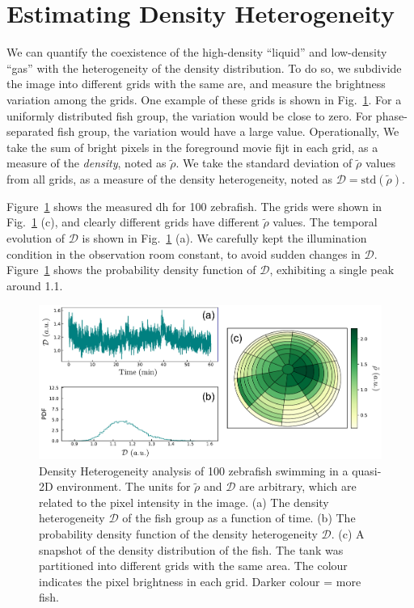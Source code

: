 \documentclass[11pt,twoside]{report}
\begin{document}
\section{Estimating Density Heterogeneity}



We can quantify the coexistence of the high-density ``liquid'' and low-density ``gas'' with the heterogeneity of the density distribution.
To do so, we subdivide the image into different grids with the same are, and measure the brightness variation among the grids.
One example of these grids is shown in Fig.~\ref{fig:density}.
For a uniformly distributed fish group, the variation would be close to zero. For phase-separated fish group, the variation would have a large value. 
Operationally, We take the sum of bright pixels in the foreground movie \gls{fijt} in each grid, as a measure of the \emph{density}, noted as $\tilde{\rho}$. We take the standard deviation of $\tilde{\rho}$ values from all grids, as a measure of the density heterogeneity, noted as $\mathcal{D} = \mathrm{std}(\tilde\rho)$.


Figure~\ref{fig:density} shows the measured \gls{dh} for 100 zebrafish. The grids were shown in Fig.~\ref{fig:density} (c), and clearly different grids have different $\tilde{\rho}$ values. The temporal evolution of $\mathcal{D}$ is shown in Fig.~\ref{fig:density} (a). We carefully kept the illumination condition in the observation room constant, to avoid sudden changes in $\mathcal{D}$. Figure~\ref{fig:density} shows the probability density function of $\mathcal{D}$, exhibiting a single peak around 1.1.


\begin{figure}
  \includegraphics[width=\linewidth]{density}
  \caption[Density Heterogeneity analysis of 100 zebrafish]{
  Density Heterogeneity analysis of 100 zebrafish swimming in a quasi-2D environment. The units for $\tilde{\rho}$ and $\mathcal{D}$ are arbitrary, which are related to the pixel intensity in the image.
  (a) The density heterogeneity $\mathcal{D}$ of the fish group as a function of time. 
  (b) The probability density function of the density heterogeneity $\mathcal{D}$.
  (c) A snapshot of the density distribution of the fish. The tank was partitioned into different grids with the same area. The colour indicates the pixel brightness in each grid. Darker colour = more fish.
  }
  \label{fig:density}
\end{figure}
\end{document}
